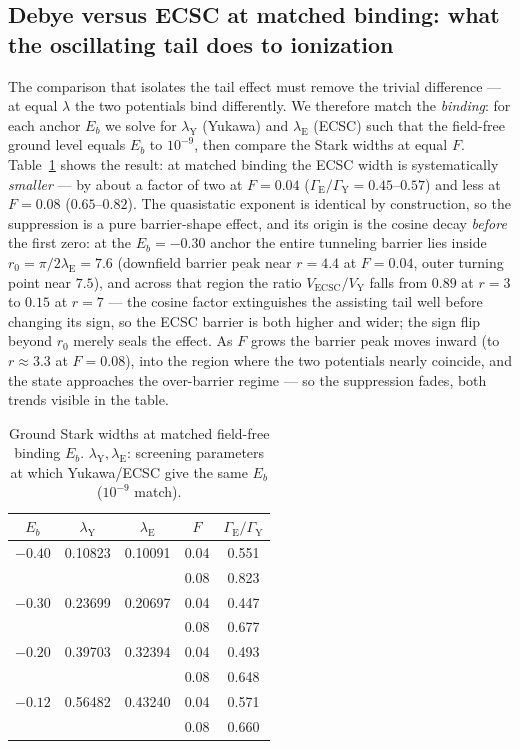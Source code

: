 \documentclass[aps,pre,twocolumn,superscriptaddress,floatfix,longbibliography]{revtex4-2}
\begin{document}
\subsection{Debye versus ECSC at matched binding: what the
oscillating tail does to ionization}
\label{sec:matched}

The comparison that isolates the tail effect must remove the
trivial difference --- at equal $\lambda$ the two potentials bind
differently. We therefore match the \emph{binding}: for each anchor
$E_b$ we solve for $\lambda_{\mathrm{Y}}$ (Yukawa) and
$\lambda_{\mathrm{E}}$ (ECSC) such that the field-free ground level
equals $E_b$ to $10^{-9}$, then compare the Stark widths at equal
$F$. Table~\ref{tab:matched} shows the result: at matched binding
the ECSC width is systematically \emph{smaller} --- by about a
factor of two at $F=0.04$ ($\Gamma_{\mathrm{E}}/\Gamma_{\mathrm{Y}}
=0.45$--$0.57$) and less at $F=0.08$ ($0.65$--$0.82$). The
quasistatic exponent is identical by construction, so the
suppression is a pure barrier-shape effect, and its origin is the
cosine decay \emph{before} the first zero: at the $E_b=-0.30$
anchor the entire tunneling barrier lies inside
$r_0=\pi/2\lambda_{\mathrm{E}}=7.6$ (downfield barrier peak near
$r=4.4$ at $F=0.04$, outer turning point near $7.5$), and across
that region the ratio $V_{\mathrm{ECSC}}/V_{\mathrm{Y}}$ falls from
$0.89$ at $r=3$ to $0.15$ at $r=7$ --- the cosine factor
extinguishes the assisting tail well before changing its sign, so
the ECSC barrier is both higher and wider; the sign flip beyond
$r_0$ merely seals the effect. As $F$ grows the barrier peak moves
inward (to $r\approx3.3$ at $F=0.08$), into the region where the
two potentials nearly coincide, and the state approaches the
over-barrier regime --- so the suppression fades, both trends
visible in the table.

\begin{table}[tb]
\caption{\label{tab:matched}Ground Stark widths at matched
field-free binding $E_b$. $\lambda_{\mathrm{Y}},
\lambda_{\mathrm{E}}$: screening parameters at which Yukawa/ECSC
give the same $E_b$ ($10^{-9}$ match).}
\begin{ruledtabular}
\begin{tabular}{ccccc}
$E_b$ & $\lambda_{\mathrm{Y}}$ & $\lambda_{\mathrm{E}}$ & $F$ &
$\Gamma_{\mathrm{E}}/\Gamma_{\mathrm{Y}}$ \\
\hline
$-0.40$ & 0.10823 & 0.10091 & 0.04 & 0.551 \\
        &         &         & 0.08 & 0.823 \\
$-0.30$ & 0.23699 & 0.20697 & 0.04 & 0.447 \\
        &         &         & 0.08 & 0.677 \\
$-0.20$ & 0.39703 & 0.32394 & 0.04 & 0.493 \\
        &         &         & 0.08 & 0.648 \\
$-0.12$ & 0.56482 & 0.43240 & 0.04 & 0.571 \\
        &         &         & 0.08 & 0.660 \\
\end{tabular}
\end{ruledtabular}
\end{table}
\end{document}
